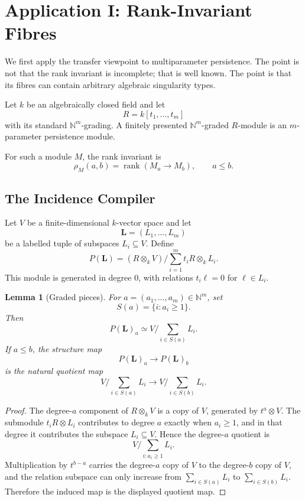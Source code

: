 \documentclass[11pt]{article}
\newtheorem{lemma}[theorem]{Lemma}
\DeclareMathOperator{\rank}{rank}
\begin{document}
\section{Application I: Rank-Invariant Fibres}

We first apply the transfer viewpoint to multiparameter persistence. The point is not that the rank invariant is incomplete; that is well known. The point is that its fibres can contain arbitrary algebraic singularity types.

Let \(k\) be an algebraically closed field and let
\[
R=k[t_1,\ldots,t_m]
\]
with its standard \(\mathbb N^m\)-grading. A finitely presented \(\mathbb N^m\)-graded \(R\)-module is an \(m\)-parameter persistence module.

For such a module \(M\), the rank invariant is
\[
\rho_M(a,b)=\rank(M_a\to M_b),
\qquad a\leq b.
\]

\subsection{The Incidence Compiler}

Let \(V\) be a finite-dimensional \(k\)-vector space and let
\[
\mathbf L=(L_1,\ldots,L_m)
\]
be a labelled tuple of subspaces \(L_i\subseteq V\). Define
\[
P(\mathbf L)
=
(R\otimes_k V)\Big/\sum_{i=1}^m t_iR\otimes_k L_i.
\]
This module is generated in degree \(0\), with relations \(t_i\ell=0\) for \(\ell\in L_i\).

\begin{lemma}[Graded pieces]
For \(a=(a_1,\ldots,a_m)\in\mathbb N^m\), set
\[
S(a)=\{i:a_i\geq1\}.
\]
Then
\[
P(\mathbf L)_a
\simeq
V\Big/\sum_{i\in S(a)}L_i.
\]
If \(a\leq b\), the structure map
\[
P(\mathbf L)_a\to P(\mathbf L)_b
\]
is the natural quotient map
\[
V\Big/\sum_{i\in S(a)}L_i
\longrightarrow
V\Big/\sum_{i\in S(b)}L_i.
\]
\end{lemma}

\begin{proof}
The degree-\(a\) component of \(R\otimes_k V\) is a copy of \(V\), generated by \(t^a\otimes V\). The submodule \(t_iR\otimes L_i\) contributes to degree \(a\) exactly when \(a_i\ge1\), and in that degree it contributes the subspace \(L_i\subseteq V\). Hence the degree-\(a\) quotient is
\[
V/\sum_{i:a_i\ge1}L_i.
\]
Multiplication by \(t^{b-a}\) carries the degree-\(a\) copy of \(V\) to the degree-\(b\) copy of \(V\), and the relation subspace can only increase from \(\sum_{i\in S(a)}L_i\) to \(\sum_{i\in S(b)}L_i\). Therefore the induced map is the displayed quotient map.
\end{proof}
\end{document}
